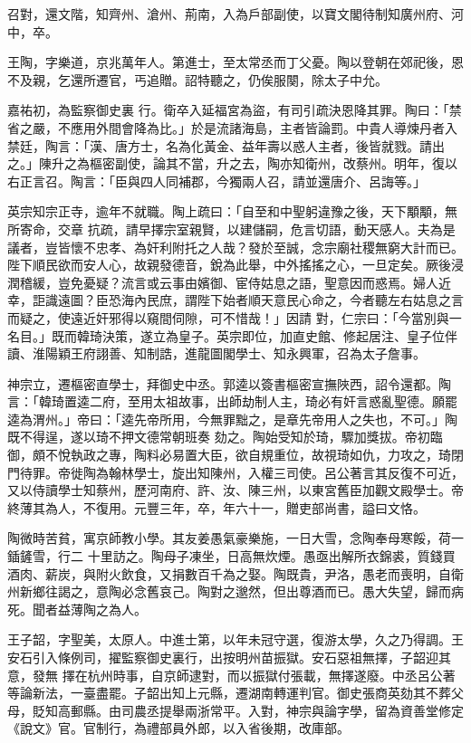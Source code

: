 \begin{pinyinscope}
 召對，還文階，知齊州、滄州、荊南，入為戶部副使，以寶文閣待制知廣州府、河中，卒。



 王陶，字樂道，京兆萬年人。第進士，至太常丞而丁父憂。陶以登朝在郊祀後，恩不及親，乞還所遷官，丐追贈。詔特聽之，仍俟服闋，除太子中允。



 嘉祐初，為監察御史裏
 行。衛卒入延福宮為盜，有司引疏決恩降其罪。陶曰：「禁省之嚴，不應用外間會降為比。」於是流諸海島，主者皆論罰。中貴人導煉丹者入禁廷，陶言：「漢、唐方士，名為化黃金、益年壽以惑人主者，後皆就戮。請出之。」陳升之為樞密副使，論其不當，升之去，陶亦知衛州，改蔡州。明年，復以右正言召。陶言：「臣與四人同補郡，今獨兩人召，請並還唐介、呂誨等。」



 英宗知宗正寺，逾年不就職。陶上疏曰：「自至和中聖躬違豫之後，天下顒顒，無所寄命，交章
 抗疏，請早擇宗室親賢，以建儲嗣，危言切語，動天感人。夫為是議者，豈皆懷不忠孝、為奸利附托之人哉？發於至誠，念宗廟社稷無窮大計而已。陛下順民欲而安人心，故親發德音，銳為此舉，中外搖搖之心，一旦定矣。厥後浸潤稽緩，豈免憂疑？流言或云事由嬪御、宦侍姑息之語，聖意因而惑焉。婦人近幸，詎識遠圖？臣恐海內民庶，謂陛下始者順天意民心命之，今者聽左右姑息之言而疑之，使遠近奸邪得以窺間伺隙，可不惜哉！」因請
 對，仁宗曰：「今當別與一名目。」既而韓琦決策，遂立為皇子。英宗即位，加直史館、修起居注、皇子位伴讀、淮陽穎王府詡善、知制誥，進龍圖閣學士、知永興軍，召為太子詹事。



 神宗立，遷樞密直學士，拜御史中丞。郭逵以簽書樞密宣撫陜西，詔令還都。陶言：「韓琦置逵二府，至用太祖故事，出師劫制人主，琦必有奸言惑亂聖德。願罷逵為渭州。」帝曰：「逵先帝所用，今無罪黜之，是章先帝用人之失也，不可。」陶既不得逞，遂以琦不押文德常朝班奏
 劾之。陶始受知於琦，驟加獎拔。帝初臨御，頗不悅執政之專，陶料必易置大臣，欲自規重位，故視琦如仇，力攻之，琦閉門待罪。帝徙陶為翰林學士，旋出知陳州，入權三司使。呂公著言其反復不可近，又以侍讀學士知蔡州，歷河南府、許、汝、陳三州，以東宮舊臣加觀文殿學士。帝終薄其為人，不復用。元豐三年，卒，年六十一，贈吏部尚書，謚曰文恪。



 陶微時苦貧，寓京師教小學。其友姜愚氣豪樂施，一日大雪，念陶奉母寒餒，荷一鍤鏟雪，行二
 十里訪之。陶母子凍坐，日高無炊煙。愚亟出解所衣錦裘，質錢買酒肉、薪炭，與附火飲食，又捐數百千為之娶。陶既貴，尹洛，愚老而喪明，自衛州新鄉往謁之，意陶必念舊哀己。陶對之邈然，但出尊酒而已。愚大失望，歸而病死。聞者益薄陶之為人。



 王子韶，字聖美，太原人。中進士第，以年未冠守選，復游太學，久之乃得調。王安石引入條例司，擢監察御史裏行，出按明州苗振獄。安石惡祖無擇，子韶迎其意，發無
 擇在杭州時事，自京師逮對，而以振獄付張載，無擇遂廢。中丞呂公著等論新法，一臺盡罷。子韶出知上元縣，遷湖南轉運判官。御史張商英劾其不葬父母，貶知高郵縣。由司農丞提舉兩浙常平。入對，神宗與論字學，留為資善堂修定《說文》官。官制行，為禮部員外郎，以入省後期，改庫部。




\end{pinyinscope}

